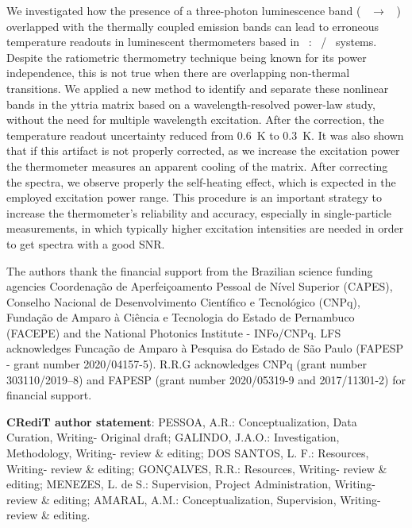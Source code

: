 \documentclass[journal=jacsat,manuscript=article, layout=twocolumn]{achemso}
\newcommand*\Yttria[1]{Y$_{2}$O$_{3}$}
\newcommand*\Yb[1]{Yb$^{3+}$}
\newcommand*\Er[1]{Er$^{3+}$}
\newcommand*\twoHnine[1]{$^2$H$_{9/2}$}
\newcommand*\fourIthirteen[1]{$^4$I$_{13/2}$}
\begin{document}
We investigated how the presence of a three-photon luminescence band (\twoHnine~ $\rightarrow$ \fourIthirteen~) overlapped with the thermally coupled emission bands can lead to erroneous temperature readouts in luminescent thermometers based in \Yttria~: \Yb~/\Er~ systems. Despite the ratiometric thermometry technique being known for its power independence, this is not true when there are overlapping non-thermal transitions. We applied a new method to identify and separate these nonlinear bands in the yttria matrix based on a wavelength-resolved power-law study, without the need for multiple wavelength excitation. After the correction, the temperature readout uncertainty reduced from \SI{0.6}{\kelvin} to \SI{0.3}{\kelvin}. It was also shown that if this artifact is not properly corrected, as we increase the excitation power the thermometer measures an apparent cooling of the matrix. After correcting the spectra, we observe properly the self-heating effect, which is expected in the employed excitation power range. This procedure is an important strategy to increase the thermometer's reliability and accuracy, especially in single-particle measurements, in which typically higher excitation intensities are needed in order to get spectra with a good SNR.

\begin{acknowledgement}
The authors thank the financial support from the Brazilian science funding agencies Coordenação de Aperfeiçoamento Pessoal de Nível Superior (CAPES), Conselho Nacional de Desenvolvimento Científico e Tecnológico (CNPq), Fundação de Amparo à Ciência e Tecnologia do Estado de Pernambuco (FACEPE) and the National Photonics Institute - INFo/CNPq. LFS acknowledges Funcação de Amparo à Pesquisa do Estado de São Paulo (FAPESP - grant number 2020/04157-5). R.R.G acknowledges CNPq (grant number 303110/2019–8) and FAPESP (grant number 2020/05319-9 and 2017/11301-2) for financial support.
\end{acknowledgement}

\textbf{CRediT author statement}: PESSOA, A.R.: Conceptualization, Data Curation, Writing- Original draft; GALINDO, J.A.O.: Investigation, Methodology, Writing- review \& editing; DOS SANTOS, L. F.: Resources, Writing- review \& editing; GONÇALVES, R.R.: Resources, Writing- review \& editing; MENEZES, L. de S.: Supervision, Project Administration, Writing- review \& editing; AMARAL, A.M.: Conceptualization, Supervision, Writing- review \& editing.


\onecolumn{
}
\end{document}

